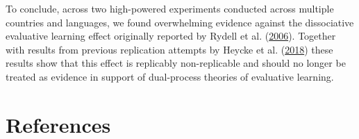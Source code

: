 \documentclass[
  man,floatsintext]{apa6}
\begin{document}
To conclude, across two high-powered experiments conducted across multiple countries and languages, we found overwhelming evidence against the dissociative evaluative learning effect originally reported by Rydell et al. (\protect\hyperlink{ref-rydell_two_2006}{2006}).
Together with results from previous replication attempts by Heycke et al. (\protect\hyperlink{ref-heycke_two_2018}{2018}) these results show that this effect is replicably non-replicable and should no longer be treated as evidence in support of dual-process theories of evaluative learning.

\newpage

\hypertarget{references}{%
\section{References}\label{references}}

\begingroup
\setlength{\parskip}{0pt}
\setlength{\parindent}{-0.5in}
\setlength{\leftskip}{0.5in}
\end{document}
